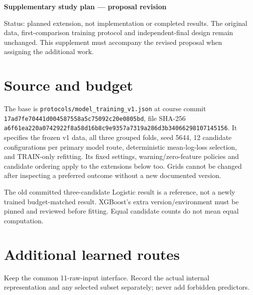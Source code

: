 \documentclass[11pt,letterpaper]{article}
\begin{document}
\begin{center}{\fontsize{16}{18}\selectfont\bfseries Supplementary study plan — proposal revision\par}\end{center}

{\centering\small Status: planned extension, not implementation or completed results. The original data, first-comparison training protocol and independent-final design remain unchanged. This supplement must accompany the revised proposal when assigning the additional work.\par}

\section*{Source and budget}

The base is \texttt{protocols/model\_\allowbreak{}training\_\allowbreak{}v1.json} at course commit \texttt{17ad7fe70441d004\allowbreak{}587558a5c75092c2\allowbreak{}0e0805bd}, file SHA-256 \texttt{a6f61ea220a07429\allowbreak{}22f8a58d16b8c9e9\allowbreak{}357a7319a286d3b3\allowbreak{}4066298107145156}. It specifies the frozen v1 data, all three grouped folds, seed 5644, 12 candidate configurations per primary model route, deterministic mean-log-loss selection, and TRAIN-only refitting. Its fixed settings, warning/zero-feature policies and candidate ordering apply to the extensions below too. Grids cannot be changed after inspecting a preferred outcome without a new documented version.

The old committed three-candidate Logistic result is a reference, not a newly trained budget-matched result. XGBoost's extra version/environment must be pinned and reviewed before fitting. Equal candidate counts do not mean equal computation.

\section*{Additional learned routes}

Keep the common 11-raw-input interface. Record the actual internal representation and any selected subset separately; never add forbidden predictors.
\end{document}
